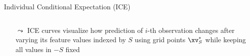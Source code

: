 \documentclass[11pt,compress,t,notes=noshow, aspectratio=169, xcolor=table]{beamer}
\begin{document}
\begin{frame}[c]{Individual Conditional Expectation (ICE) }
\begin{columns}[T, totalwidth=\textwidth]
\begin{column}{0.84\textwidth}
\medskip

\begin{itemize}
    \item[$\leadsto$] ICE curves visualize how prediction of $i$-th observation changes after varying its feature values indexed by $S$ using grid points $\xv_S^*$ while keeping all values in $-S$ fixed

\end{itemize}



\end{column}
\end{columns}



%
\end{frame}
\end{document}
